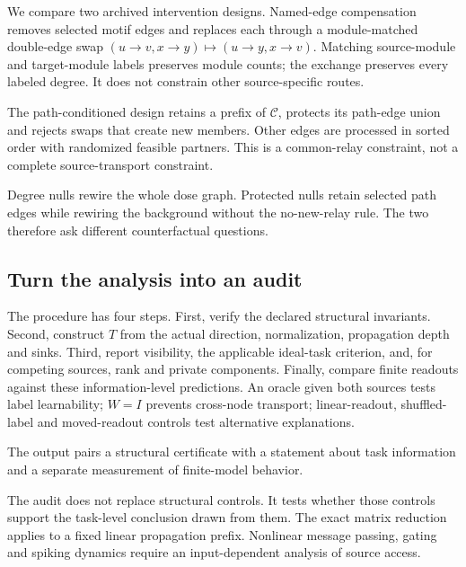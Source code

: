 We compare two archived intervention designs. Named-edge compensation
removes selected motif edges and replaces each through a module-matched
double-edge swap
$(u\!\to\!v,x\!\to\!y)\mapsto(u\!\to\!y,x\!\to\!v)$.
Matching source-module and target-module labels preserves module counts;
the exchange preserves every labeled degree. It does not constrain
other source-specific routes.

The path-conditioned design retains a prefix of $\mathcal C$, protects its
path-edge union and rejects swaps that create new members. Other edges
are processed in sorted order with randomized feasible partners. This is
a common-relay constraint, not a complete source-transport constraint.

Degree nulls rewire the whole dose graph. Protected nulls retain selected
path edges while rewiring the background without the no-new-relay rule.
The two therefore ask different counterfactual questions.

\subsection{Turn the analysis into an audit}
\label{sec:controls}

The procedure has four steps. First, verify the declared structural
invariants. Second, construct $T$ from the actual direction, normalization,
propagation depth and sinks. Third, report visibility, the applicable
ideal-task criterion, and, for competing sources, rank and private
components. Finally, compare finite readouts against these information-level
predictions. An oracle given both sources tests label learnability;
$W=I$ prevents cross-node transport; linear-readout, shuffled-label and
moved-readout controls test alternative explanations.

The output pairs a structural certificate with a statement about task
information and a separate measurement of finite-model behavior.

The audit does not replace structural controls. It tests whether those
controls support the task-level conclusion drawn from them. The exact matrix
reduction applies to a fixed linear propagation prefix. Nonlinear message
passing, gating and spiking dynamics require an input-dependent analysis of
source access.
